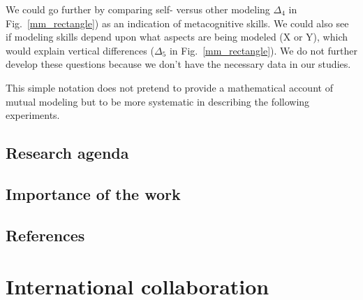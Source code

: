 \documentclass{report}
\newcommand{\Model}[3]{{$\mathcal{M}^{\circ}(#1, #2, #3)$}}
\begin{document}
We could go further by comparing self- versus other modeling $\Delta_4$ in
Fig.~\ref{mm_rectangle}) as an indication of metacognitive skills. We could also
see if modeling skills depend upon what aspects are being modeled (X or Y),
which would explain vertical differences ($\Delta_5$ in
Fig.~\ref{mm_rectangle}). We do not further develop these questions because we
don’t have the necessary data in our studies.

\begin{figure*}[htb]
\centering


\caption{The rectangle questions}

\label{mm_rectangle}
\end{figure*}


This simple notation does not pretend to provide a mathematical account of
mutual modeling but to be more systematic in describing the following
experiments. 

\subsection{Research agenda}

\subsection{Importance of the work}

\subsection{References}





\section{International collaboration}
\end{document}
